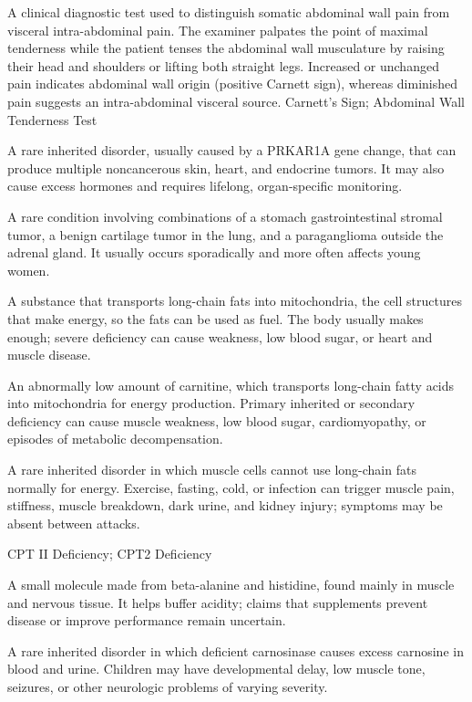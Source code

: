  A clinical diagnostic test used to distinguish somatic abdominal wall pain from visceral intra-abdominal pain. The examiner palpates the point of maximal tenderness while the patient tenses the abdominal wall musculature by raising their head and shoulders or lifting both straight legs. Increased or unchanged pain indicates abdominal wall origin (positive Carnett sign), whereas diminished pain suggests an intra-abdominal visceral source.
\synonyms
Carnett's Sign; Abdominal Wall Tenderness Test

 A rare inherited disorder, usually caused by a PRKAR1A gene change, that can produce multiple noncancerous skin, heart, and endocrine tumors. It may also cause excess hormones and requires lifelong, organ-specific monitoring.

 A rare condition involving combinations of a stomach gastrointestinal stromal tumor, a benign cartilage tumor in the lung, and a paraganglioma outside the adrenal gland. It usually occurs sporadically and more often affects young women.

 A substance that transports long-chain fats into mitochondria, the cell structures that make energy, so the fats can be used as fuel. The body usually makes enough; severe deficiency can cause weakness, low blood sugar, or heart and muscle disease.

 An abnormally low amount of carnitine, which transports long-chain fatty acids into mitochondria for energy production. Primary inherited or secondary deficiency can cause muscle weakness, low blood sugar, cardiomyopathy, or episodes of metabolic decompensation.

 A rare inherited disorder in which muscle cells cannot use long-chain fats normally for energy. Exercise, fasting, cold, or infection can trigger muscle pain, stiffness, muscle breakdown, dark urine, and kidney injury; symptoms may be absent between attacks.

\synonyms
CPT II Deficiency; CPT2 Deficiency

 A small molecule made from beta-alanine and histidine, found mainly in muscle and nervous tissue. It helps buffer acidity; claims that supplements prevent disease or improve performance remain uncertain.

 A rare inherited disorder in which deficient carnosinase causes excess carnosine in blood and urine. Children may have developmental delay, low muscle tone, seizures, or other neurologic problems of varying severity.

